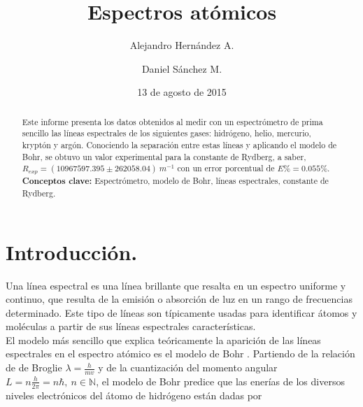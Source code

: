 \documentclass[prb,aps,twocolumn,preprintnumbers,amsmath,amssymb]{revtex4}
\begin{document}
\title{Espectros atómicos}%

\author{Alejandro Hernández A.}%
\author{Daniel Sánchez M.}%
%


\date{13 de agosto de 2015}%

\begin{abstract}
Este informe presenta los datos obtenidos al medir con un espectrómetro de prima sencillo las líneas espectrales de los siguientes gases: hidrógeno, helio, mercurio, kryptón y argón. Conociendo  la separación entre estas líneas y aplicando el modelo de Bohr, se obtuvo un valor experimental para la constante de Rydberg, a saber, $R_{exp} = (10967597.395 \pm 262058.04)\ m^{-1}$ con un error porcentual de $E\% = 0.055\%$.
\\

\noindent \textbf{Conceptos clave:} Espectrómetro, modelo de Bohr, líneas espectrales, constante de Rydberg.
\end{abstract}
                             
\maketitle

\section{\label{sec:level1}Introducción.}

Una línea espectral es una línea brillante que resalta en un espectro uniforme y continuo, que resulta de la emisión o absorción de luz en un rango de frecuencias determinado. Este tipo de líneas son típicamente usadas para identificar átomos y moléculas a partir de sus líneas espectrales características.\\

El modelo más sencillo que explica teóricamente la aparición de las líneas espectrales en el espectro atómico es el modelo de Bohr \cite{eisberg}. Partiendo de la relación de de Broglie $\lambda = \frac{h}{mv}$ y de la cuantización del momento angular $L = n\frac{h}{2\pi} = n\hbar, \ n \in \mathbb{N}$, el modelo de Bohr predice que las enerías de los diversos niveles electrónicos del átomo de hidrógeno están dadas por
\end{document}
